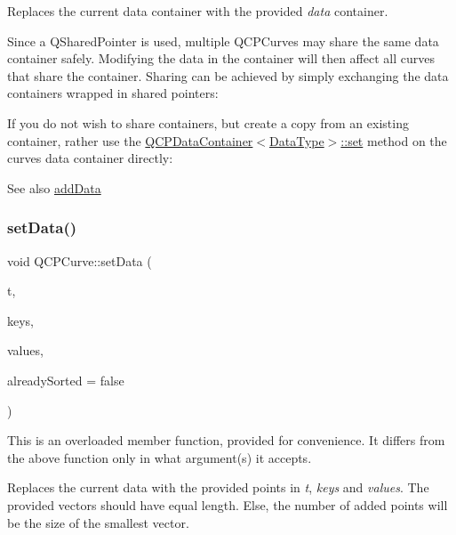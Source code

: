 Replaces the current data container with the provided {\itshape data} container.

Since a Q\+Shared\+Pointer is used, multiple Q\+C\+P\+Curves may share the same data container safely. Modifying the data in the container will then affect all curves that share the container. Sharing can be achieved by simply exchanging the data containers wrapped in shared pointers\+: 
\begin{DoxyCodeInclude}
\end{DoxyCodeInclude}
 If you do not wish to share containers, but create a copy from an existing container, rather use the \hyperlink{class_q_c_p_data_container_ae7042bd534fc3ce7befa2ce3f790b5bf}{Q\+C\+P\+Data\+Container$<$\+Data\+Type$>$\+::set} method on the curve\textquotesingle{}s data container directly\+: 
\begin{DoxyCodeInclude}
\end{DoxyCodeInclude}
 \begin{DoxySeeAlso}{See also}
\hyperlink{class_q_c_p_curve_a73edf394b94f3f24f07518e30565a07f}{add\+Data} 
\end{DoxySeeAlso}
\mbox{\label{class_q_c_p_curve_a0768af2c33c8dcffa3cf5bdeb53923a6}} 
\subsubsection{\texorpdfstring{set\+Data()}{setData()}\hspace{0.1cm}{\footnotesize\ttfamily [2/3]}}
{\footnotesize\ttfamily void Q\+C\+P\+Curve\+::set\+Data (\begin{DoxyParamCaption}\item[{const Q\+Vector$<$ double $>$ \&}]{t,  }\item[{const Q\+Vector$<$ double $>$ \&}]{keys,  }\item[{const Q\+Vector$<$ double $>$ \&}]{values,  }\item[{bool}]{already\+Sorted = {\ttfamily false} }\end{DoxyParamCaption})}

This is an overloaded member function, provided for convenience. It differs from the above function only in what argument(s) it accepts.

Replaces the current data with the provided points in {\itshape t}, {\itshape keys} and {\itshape values}. The provided vectors should have equal length. Else, the number of added points will be the size of the smallest vector.

